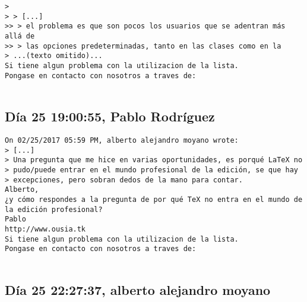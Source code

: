 \documentclass[a4paper,10pt]{article}
\begin{document}
\begin{lstlisting}
>
> > [...]
>> > el problema es que son pocos los usuarios que se adentran más allá de
>> > las opciones predeterminadas, tanto en las clases como en la
> ...(texto omitido)...
Si tiene algun problema con la utilizacion de la lista.
Pongase en contacto con nosotros a traves de:


\end{lstlisting}

\subsection{Día 25 19:00:55, Pablo Rodríguez}

\begin{lstlisting}
On 02/25/2017 05:59 PM, alberto alejandro moyano wrote:
> [...]
> Una pregunta que me hice en varias oportunidades, es porqué LaTeX no
> pudo/puede entrar en el mundo profesional de la edición, se que hay
> excepciones, pero sobran dedos de la mano para contar.
Alberto,
¿y cómo respondes a la pregunta de por qué TeX no entra en el mundo de
la edición profesional?
Pablo
http://www.ousia.tk
Si tiene algun problema con la utilizacion de la lista.
Pongase en contacto con nosotros a traves de:


\end{lstlisting}

\subsection{Día 25 22:27:37, alberto alejandro moyano}
\end{document}
